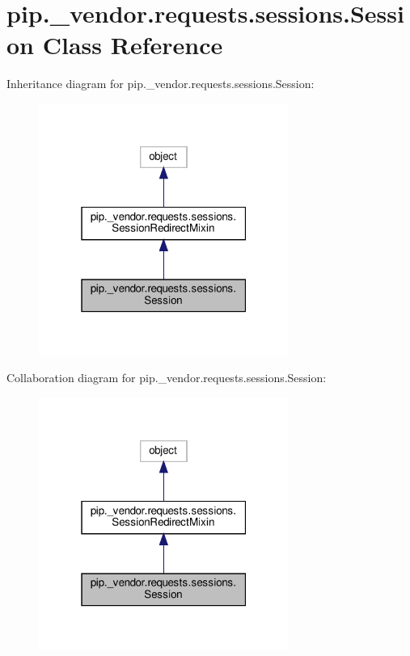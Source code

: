 \hypertarget{classpip_1_1__vendor_1_1requests_1_1sessions_1_1Session}{}\section{pip.\+\_\+vendor.\+requests.\+sessions.\+Session Class Reference}
\label{classpip_1_1__vendor_1_1requests_1_1sessions_1_1Session}


Inheritance diagram for pip.\+\_\+vendor.\+requests.\+sessions.\+Session\+:
\nopagebreak
\begin{figure}[H]
\begin{center}
\leavevmode
\includegraphics[width=232pt]{classpip_1_1__vendor_1_1requests_1_1sessions_1_1Session__inherit__graph}
\end{center}
\end{figure}


Collaboration diagram for pip.\+\_\+vendor.\+requests.\+sessions.\+Session\+:
\nopagebreak
\begin{figure}[H]
\begin{center}
\leavevmode
\includegraphics[width=232pt]{classpip_1_1__vendor_1_1requests_1_1sessions_1_1Session__coll__graph}
\end{center}
\end{figure}
